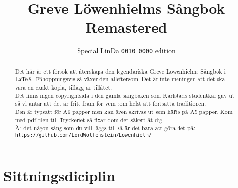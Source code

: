 \documentclass[twoside, openright]{report}
\title{Greve Löwenhielms Sångbok Remastered}
\author{Special LinDa \texttt{0010 0000} edition}
\begin{document}
\maketitle
\thispagestyle{empty}

\cleardoublepage
\begin{abstract}
Det här är ett försök att återskapa den legendariska Greve Löwenhielms Sångbok i \LaTeX. Fö\-hoppningsvis så växer den alleftersom. Det är inte meningen att det ska vara en exakt kopia, tillägg är tillåtet.\\

Det finns ingen copyrightsida i den gamla sångboken som Karlstads studentkår gav ut så vi antar att det är fritt fram för vem som helst att fortsätta traditionen.\\

Den är typsatt för A6-papper men kan även skrivas ut som häfte på A5-papper. Kom med pdf-filen till Tryckeriet så fixar dom det säkert åt dig.\\

Är det någon sång som du vill läggs till så är det bara att göra det på:\\
\texttt{\small https://github.com/LordWolfenstein/Lowenhielm/}
\end{abstract}
\thispagestyle{empty}
\tableofcontents

\chapter*{Sittningsdiciplin}
\end{document}
